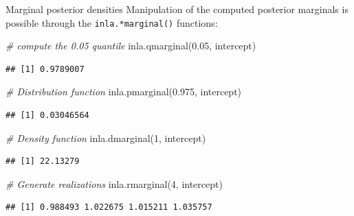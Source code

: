 \documentclass[
  ignorenonframetext,
]{beamer}
\newenvironment{Shaded}{\begin{snugshade}}{\end{snugshade}}
\newcommand{\CommentTok}[1]{\textcolor[rgb]{0.56,0.35,0.01}{\textit{#1}}}
\newcommand{\DecValTok}[1]{\textcolor[rgb]{0.00,0.00,0.81}{#1}}
\newcommand{\FloatTok}[1]{\textcolor[rgb]{0.00,0.00,0.81}{#1}}
\newcommand{\FunctionTok}[1]{\textcolor[rgb]{0.00,0.00,0.00}{#1}}
\newcommand{\NormalTok}[1]{#1}
\begin{document}
\begin{frame}[fragile]{Marginal posterior densities}
\protect\hypertarget{marginal-posterior-densities-2}{}
Manipulation of the computed posterior marginals is possible through the
\texttt{inla.*marginal()} functions:

\small

\begin{Shaded}
\begin{Highlighting}[]
\CommentTok{\# compute the 0.05 quantile}
\FunctionTok{inla.qmarginal}\NormalTok{(}\FloatTok{0.05}\NormalTok{, intercept)}
\end{Highlighting}
\end{Shaded}

\begin{verbatim}
## [1] 0.9789007
\end{verbatim}

\begin{Shaded}
\begin{Highlighting}[]
\CommentTok{\# Distribution function}
\FunctionTok{inla.pmarginal}\NormalTok{(}\FloatTok{0.975}\NormalTok{, intercept)}
\end{Highlighting}
\end{Shaded}

\begin{verbatim}
## [1] 0.03046564
\end{verbatim}

\begin{Shaded}
\begin{Highlighting}[]
\CommentTok{\# Density function}
\FunctionTok{inla.dmarginal}\NormalTok{(}\DecValTok{1}\NormalTok{, intercept)}
\end{Highlighting}
\end{Shaded}

\begin{verbatim}
## [1] 22.13279
\end{verbatim}

\begin{Shaded}
\begin{Highlighting}[]
\CommentTok{\# Generate realizations}
\FunctionTok{inla.rmarginal}\NormalTok{(}\DecValTok{4}\NormalTok{, intercept)}
\end{Highlighting}
\end{Shaded}

\begin{verbatim}
## [1] 0.988493 1.022675 1.015211 1.035757
\end{verbatim}

\normalsize
\end{frame}
\end{document}
